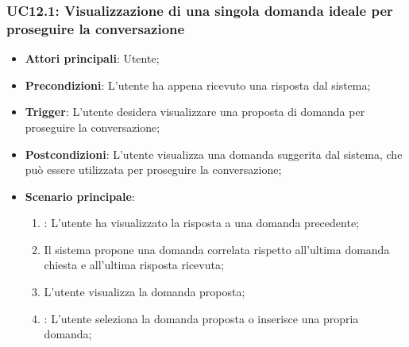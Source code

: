 \subsubsection{UC12.1: Visualizzazione di una singola domanda ideale per proseguire la conversazione}
\begin{itemize}
    \item \textbf{Attori principali}: Utente;
    \item \textbf{Precondizioni}: L'utente ha appena ricevuto una risposta dal sistema;
    \item \textbf{Trigger}: L'utente desidera visualizzare una proposta di domanda per proseguire la conversazione;
    \item \textbf{Postcondizioni}: L'utente visualizza una domanda suggerita dal sistema, che può essere utilizzata per proseguire la conversazione;
    \item \textbf{Scenario principale}:
    \begin{enumerate}
        \item {}: L'utente ha visualizzato la risposta a una domanda precedente;
        \item Il sistema propone una domanda correlata rispetto all'ultima domanda chiesta
        e all'ultima risposta ricevuta;
        \item L'utente visualizza la domanda proposta;
        \item {}: L'utente seleziona la domanda proposta o inserisce una propria domanda;
    \end{enumerate}
\end{itemize}

\hypertarget{UC13}{}
